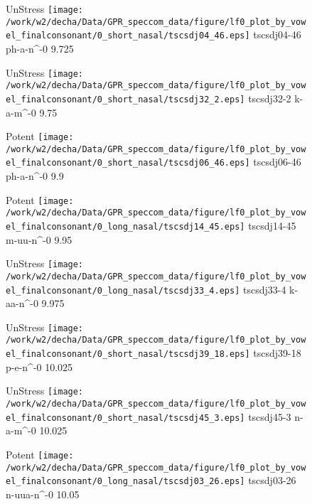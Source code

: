 \documentclass{article}
\begin{document}
\begin{figure}[t]
\begin{minipage}[b]{.24\textwidth}
UnStress
\centering
\texttt{[image: /work/w2/decha/Data/GPR\_speccom\_data/figure/lf0\_plot\_by\_vowel\_finalconsonant/0\_short\_nasal/tscsdj04\_46.eps]}
tscsdj04-46 ph-a-n\textasciicircum-0 9.725
\end{minipage}
\begin{minipage}[b]{.24\textwidth}
UnStress
\centering
\texttt{[image: /work/w2/decha/Data/GPR\_speccom\_data/figure/lf0\_plot\_by\_vowel\_finalconsonant/0\_short\_nasal/tscsdj32\_2.eps]}
tscsdj32-2 k-a-m\textasciicircum-0 9.75
\end{minipage}
\begin{minipage}[b]{.24\textwidth}
\colorbox{Apricot}{Potent}
\centering
\texttt{[image: /work/w2/decha/Data/GPR\_speccom\_data/figure/lf0\_plot\_by\_vowel\_finalconsonant/0\_short\_nasal/tscsdj06\_46.eps]}
tscsdj06-46 ph-a-n\textasciicircum-0 9.9
\end{minipage}
\begin{minipage}[b]{.24\textwidth}
\colorbox{Apricot}{Potent}
\centering
\texttt{[image: /work/w2/decha/Data/GPR\_speccom\_data/figure/lf0\_plot\_by\_vowel\_finalconsonant/0\_long\_nasal/tscsdj14\_45.eps]}
tscsdj14-45 m-uu-n\textasciicircum-0 9.95
\end{minipage}
\end{figure}
\clearpage
\begin{figure}[t]
\begin{minipage}[b]{.24\textwidth}
UnStress
\centering
\texttt{[image: /work/w2/decha/Data/GPR\_speccom\_data/figure/lf0\_plot\_by\_vowel\_finalconsonant/0\_long\_nasal/tscsdj33\_4.eps]}
tscsdj33-4 k-aa-n\textasciicircum-0 9.975
\end{minipage}
\begin{minipage}[b]{.24\textwidth}
UnStress
\centering
\texttt{[image: /work/w2/decha/Data/GPR\_speccom\_data/figure/lf0\_plot\_by\_vowel\_finalconsonant/0\_short\_nasal/tscsdj39\_18.eps]}
tscsdj39-18 p-e-n\textasciicircum-0 10.025
\end{minipage}
\begin{minipage}[b]{.24\textwidth}
UnStress
\centering
\texttt{[image: /work/w2/decha/Data/GPR\_speccom\_data/figure/lf0\_plot\_by\_vowel\_finalconsonant/0\_short\_nasal/tscsdj45\_3.eps]}
tscsdj45-3 n-a-m\textasciicircum-0 10.025
\end{minipage}
\begin{minipage}[b]{.24\textwidth}
\colorbox{Apricot}{Potent}
\centering
\texttt{[image: /work/w2/decha/Data/GPR\_speccom\_data/figure/lf0\_plot\_by\_vowel\_finalconsonant/0\_long\_nasal/tscsdj03\_26.eps]}
tscsdj03-26 n-uua-n\textasciicircum-0 10.05
\end{minipage}
\end{figure}
\end{document}
